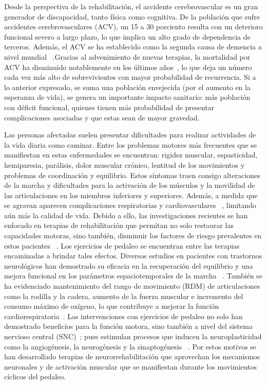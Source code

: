\begin{introduction}
    Desde la perspectiva de la rehabilitación, el accidente cerebrovascular es un gran generador de discapacidad, tanto física como cognitiva. De la población que sufre accidentes cerebrovasculares (ACV), un 15 a 30 porciento resulta con un deterioro funcional severo a largo plazo, lo que implica un alto grado de dependencia de terceros. Además, el ACV se ha establecido como la segunda causa de demencia a nivel mundial~\cite{moyano2010accidente} .Gracias al advenimiento de nuevas terapias, la mortalidad por ACV ha disminuido notablemente en los últimos años~\cite{cuadrado2009rehabilitacion,harold2007guidelines}, lo que deja un número cada vez más alto de sobrevivientes con mayor probabilidad de recurrencia. Si a lo anterior expresado, se suma una población envejecida (por el aumento en la esperanza de vida), se genera un importante impacto sanitario: más población con déficit funcional, quienes tienen más probabilidad de presentar complicaciones asociadas y que estas sean de mayor gravedad. 
    
    \vspace{5pt} 
    Las personas afectadas suelen presentar dificultades para realizar actividades de la vida diaria como caminar. Entre los problemas motores más frecuentes que se manifiestan en estas enfermedades se encuentran: rigidez muscular, espasticidad, hemiparesia, parálisis, dolor muscular crónico, lentitud de los movimientos y problemas de coordinación y equilibrio. Estos síntomas traen consigo alteraciones de la marcha y dificultades para la activación de los músculos y la movilidad de las articulaciones en los miembros inferiores y superiores. Además, a medida que se agravan aparecen complicaciones respiratorias y cardiovasculares ~\cite{barbosa2015application, miner2020therapeutic}, limitando aún más la calidad de vida. Debido a ello, las investigaciones recientes se han enfocado en terapias de rehabilitación que permitan no solo restaurar las capacidades motoras, sino también, disminuir los factores de riesgo prevalentes en estos pacientes ~\cite{barbosa2015application}. Los ejercicios de pedaleo se encuentran entre las terapias encaminadas a brindar tales efectos. Diversos estudios en pacientes con trastornos neurológicos han demostrado su eficacia en la recuperación del equilibrio y una mejora funcional en los parámetros espaciotemporales de la marcha ~\cite{quiles2020lessons, el2021effect}. También se ha evidenciado mantenimiento del rango de movimiento (RDM) de articulaciones como la rodilla y la cadera, aumento de la fuerza muscular e incremento del consumo máximo de oxígeno, lo que contribuye a mejorar la función cardiorespiratoria~\cite{el2021effect, ashadi2016pengaruh}. Las intervenciones con ejercicios de pedaleo no solo han demostrado beneficios para la función motora, sino también a nivel del sistema nervioso central (SNC)~\cite{linder2019forced, alberts2011not}; pues estimulan procesos que inducen la neuroplasticidad como la angiogénesis, la neurogénesis y la sinaptogénesis ~\cite{linder2019forced, el2021effect}. Por estos motivos se han desarrollado terapias de neurorrehabilitación que aprovechan los mecanismos neuronales y de activación muscular que se manifiestan durante los movimientos cíclicos del pedaleo. 
    

\end{introduction}
